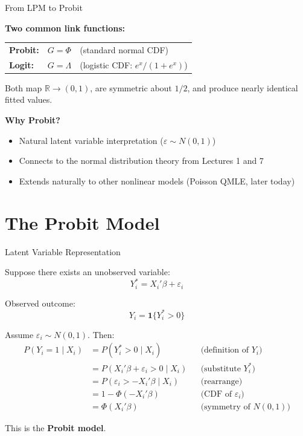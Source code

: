 \documentclass[aspectratio=169, handout, t]{beamer}
\numberwithin{equation}{section}
\begin{document}
\begin{frame}{From LPM to Probit}

\textbf{Two common link functions:}

\medskip

\begin{tabular}{lll}
\textbf{Probit:} & $G = \Phi$ & (standard normal CDF) \\
\textbf{Logit:} & $G = \Lambda$ & (logistic CDF: $e^x/(1+e^x)$)
\end{tabular}

\pause

\bigskip

Both map $\mathbb{R} \to (0,1)$, are symmetric about $1/2$, and produce nearly identical fitted values.

\pause

\bigskip

\textbf{Why Probit?}
\begin{itemize}
    \item Natural latent variable interpretation ($\varepsilon \sim N(0,1)$)
    \item Connects to the normal distribution theory from Lectures 1 and 7
    \item Extends naturally to other nonlinear models (Poisson QMLE, later today)
\end{itemize}

\end{frame}

\section{The Probit Model}

\begin{frame}{Latent Variable Representation}

Suppose there exists an unobserved variable:
\[
Y_i^* = X_i'\beta + \varepsilon_i
\]

\pause

Observed outcome:
\[
Y_i = \mathbf{1}\{Y_i^* > 0\}
\]

\pause

Assume $\varepsilon_i \sim N(0,1)$. Then:
\pause
\[
\begin{aligned}
P(Y_i=1 \mid X_i)
  &= P(Y_i^* > 0 \mid X_i) && \text{(definition of $Y_i$)} \\[2pt]
  &= P(X_i'\beta + \varepsilon_i > 0 \mid X_i) && \text{(substitute $Y_i^*$)} \\[2pt]
  &= P(\varepsilon_i > -X_i'\beta \mid X_i) && \text{(rearrange)} \\[2pt]
  &= 1 - \Phi(-X_i'\beta) && \text{(CDF of } \varepsilon_i\text{)} \\[2pt]
  &= \Phi(X_i'\beta) && \text{(symmetry of } N(0,1)\text{)}
\end{aligned}
\]

\pause

This is the \textbf{Probit model}.
\end{frame}
\end{document}

